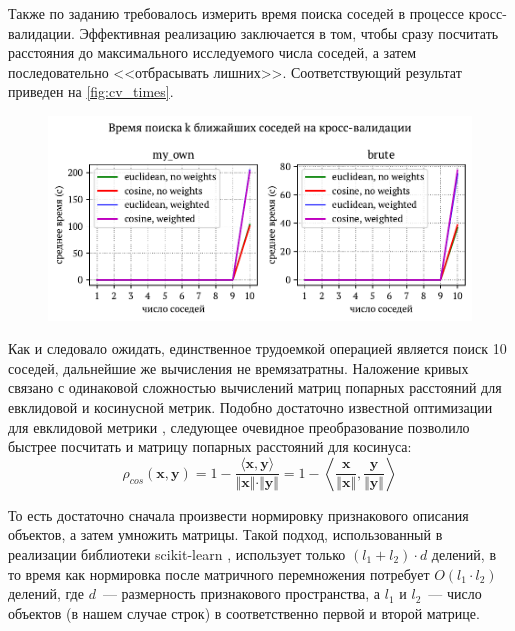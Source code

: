 \documentclass[12pt]{article}
\begin{document}
Также по заданию требовалось измерить время поиска соседей в процессе кросс-валидации. Эффективная реализацию заключается в том, чтобы сразу посчитать расстояния до максимального исследуемого числа соседей, а затем последовательно <<отбрасывать лишних>>. Соответствующий результат приведен на \autoref{fig:cv_times}.

\begin{figure}[h]
    \includegraphics{n23_cv_times}
    \caption{}
    \label{fig:cv_times}
\end{figure}

Как и следовало ожидать, единственное трудоемкой операцией является поиск 10 соседей, дальнейшие же вычисления не времязатратны. Наложение кривых связано с одинаковой сложностью вычислений матриц попарных расстояний для евклидовой и косинусной метрик. Подобно достаточно известной оптимизации для евклидовой метрики \cite{eumatrix}, следующее очевидное преобразование позволило быстрее посчитать и матрицу попарных расстояний для косинуса:
\begin{equation}
    \rho_{\scriptscriptstyle{cos}}(\mathbf{x},\mathbf{y}) = 1-\frac{\langle\mathbf{x}, \mathbf{y}\rangle}
    {\Vert{\mathbf{x}}\Vert \cdot \Vert{\mathbf{y}}\Vert} = 
    1-\left\langle
        \frac{\mathbf{x}}{\Vert{\mathbf{x}}\Vert},
        \frac{\mathbf{y}}{\Vert{\mathbf{y}}\Vert}
    \right\rangle
\end{equation}

То есть достаточно сначала произвести нормировку признакового описания объектов, а затем умножить матрицы. Такой подход, использованный в реализации библиотеки scikit-learn \cite{sklearn_api}, использует только $(l_1 + l_2) \cdot d$ делений, в то время как нормировка после матричного перемножения потребует $O(l_1\cdot l_2)$ делений, где $d$~--- размерность признакового пространства, а $l_1$ и $l_2$~--- число объектов (в нашем случае строк) в соответственно первой и второй матрице.
\end{document}
